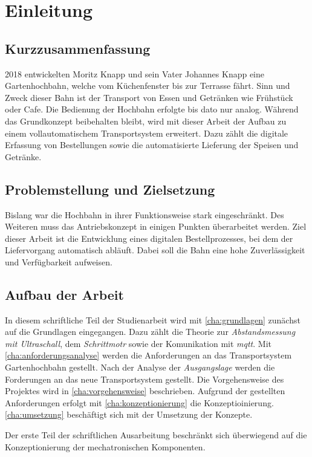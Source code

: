 \chapter{Einleitung}

\section{Kurzzusammenfassung}
2018 entwickelten Moritz Knapp und sein Vater Johannes Knapp eine Gartenhochbahn, welche vom Küchenfenster bis zur Terrasse fährt. 
Sinn und Zweck dieser Bahn ist der Transport von Essen und Getränken wie Frühstück oder Cafe. Die Bedienung der Hochbahn erfolgte bis dato nur analog. Während das Grundkonzept beibehalten bleibt, wird mit dieser Arbeit der Aufbau zu einem vollautomatischem Transportsystem erweitert. Dazu zählt die digitale Erfassung von Bestellungen sowie die automatisierte Lieferung der Speisen  und Getränke. 

\section{Problemstellung und Zielsetzung}
    
Bislang war die Hochbahn in ihrer Funktionsweise stark eingeschränkt. Des Weiteren muss das Antriebskonzept in einigen Punkten überarbeitet werden. Ziel dieser Arbeit ist die Entwicklung eines digitalen Bestellprozesses, bei dem der Liefervorgang automatisch abläuft. Dabei soll die Bahn eine hohe Zuverlässigkeit und Verfügbarkeit aufweisen. 
\newpage

\section{Aufbau der Arbeit}
In diesem schriftliche Teil der Studienarbeit wird mit \autoref{cha:grundlagen} zunächst auf die Grundlagen eingegangen. Dazu zählt die Theorie zur \textit{Abstandsmessung mit Ultraschall}, dem \textit{Schrittmotr} sowie der Komunikation mit \textit{\acrshort{mqtt}}. 
Mit \autoref{cha:anforderungsanalyse} werden die Anforderungen an das Transportsystem Gartenhochbahn gestellt. Nach der Analyse der \textit{Ausgangslage} werden die Forderungen an das neue Transportsystem gestellt. Die Vorgehensweise des Projektes wird in \autoref{cha:vorgehensweise} beschrieben. Aufgrund der gestellten Anforderungen erfolgt mit \autoref{cha:konzeptionierung} die Konzeptioinierung. \autoref{cha:umsetzung} beschäftigt sich mit der Umsetzung der Konzepte. 

Der erste Teil der schriftlichen Ausarbeitung beschränkt sich überwiegend auf die Konzeptionierung der mechatronischen Komponenten. 